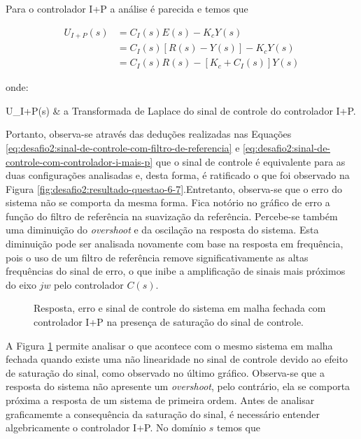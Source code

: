 Para o controlador I+P a análise é parecida e temos que

\begin{equation}
    \label{eq:desafio2:sinal-de-controle-com-controlador-i-mais-p}
    \begin{split}
        U_{I+P}(s) &= C_{I}(s)E(s) - K_{c}Y(s) \\
                   &= C_{I}(s)[R(s) - Y(s)] - K_{c}Y(s) \\
                   &= C_{I}(s)R(s) - [K_{c} + C_{I}(s)]Y(s)
    \end{split}
\end{equation}

onde:

\begin{conditions*}
    U_{I+P}(s) & a Transformada de Laplace do sinal de controle do controlador I+P.
\end{conditions*}

Portanto, observa-se através das deduções realizadas nas Equações
\ref{eq:desafio2:sinal-de-controle-com-filtro-de-referencia} e
\ref{eq:desafio2:sinal-de-controle-com-controlador-i-mais-p} que o sinal de
controle é equivalente para as duas configurações analisadas e, desta forma, é
ratificado o que foi observado na Figura
\ref{fig:desafio2:resultado-questao-6-7}.Entretanto, observa-se que o erro do
sistema não se comporta da mesma forma. Fica notório no gráfico de erro a função
do filtro de referência na suavização da referência. Percebe-se também uma
diminuição do \textit{overshoot} e da oscilação na resposta do sistema. Esta
diminuição pode ser analisada novamente com base na resposta em frequência, pois
o uso de um filtro de referência remove significativamente as altas frequências
do sinal de erro, o que inibe a amplificação de sinais mais próximos do eixo
$jw$ pelo controlador $C(s)$.

\begin{figure}[!ht]
    \caption{Resposta, erro e sinal de controle do sistema em malha fechada com
    controlador I+P na presença de saturação do sinal de controle.}
    \vspace{-10pt}
    \hspace{-30pt}
    \label{fig:desafio2:resultado-questao-8}
    \begin{minipage}{\linewidth}
        
    \end{minipage}
\end{figure}

A Figura \ref{fig:desafio2:resultado-questao-8} permite analisar o que acontece
com o mesmo sistema em malha fechada quando existe uma não linearidade no sinal
de controle devido ao efeito de saturação do sinal, como observado no último
gráfico. Observa-se que a resposta do sistema não apresente um
\textit{overshoot}, pelo contrário, ela se comporta próxima a resposta de um
sistema de primeira ordem. Antes de analisar graficamemte a consequência da
saturação do sinal, é necessário entender algebricamente o controlador I+P. No
domínio $s$ temos que 

